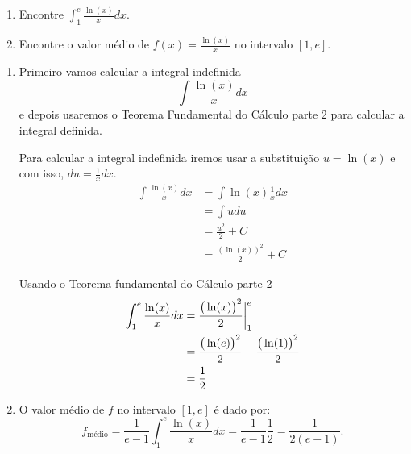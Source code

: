 \begin{example}
\begin{enumerate}[label=\alph*)]
  \item Encontre \(\int_1^e \frac{\ln(x)}{x}dx\).
  \item Encontre o valor médio de \(f(x)=\frac{\ln(x)}{x}\)
        no intervalo $[1, e]$.
\end{enumerate}
\solution
\begin{enumerate}[label=\alph*)]
 \item
  Primeiro vamos calcular a integral indefinida
  \[\int \frac{\ln(x)}{x} dx\]
  e depois usaremos o
  Teorema Fundamental do Cálculo parte 2 para calcular a integral definida.

  Para calcular a integral indefinida iremos usar a substituição
  $u=\ln(x)$ e com isso, \(du= \frac{1}{x}dx\).
  \begin{align*}
    \int \frac{\ln(x)}{x} dx
    & = \int \ln(x) \frac{1}{x} dx \\
    & = \int u du \\
    & = \frac{u^2}{2}+C \\
    & = \frac{(\ln(x))^2}{2}+C
  \end{align*}

  Usando o Teorema fundamental do Cálculo parte 2
  \begin{align*}
    \int_1^e \frac{\ln(x)}{x} dx
    & = \frac{\big(\ln(x)\big)^2}{2} \bigg\rvert_{1}^{e}    \\
    & = \frac{\big(\ln(e)\big)^2}{2} - \frac{\big(\ln(1)\big)^2}{2} \\
    & = \frac{1}{2}
  \end{align*}

  \item
  O valor médio de $f$ no intervalo $[1, e]$ é dado por:
  \[
    f_{\text{médio}}
    = \frac{1}{e-1} \int_1^e \frac{\ln(x)}{x} dx
    = \frac{1}{e-1} \frac{1}{2}
    = \frac{1}{2(e-1)}.
  \]
\end{enumerate}
\end{example}

